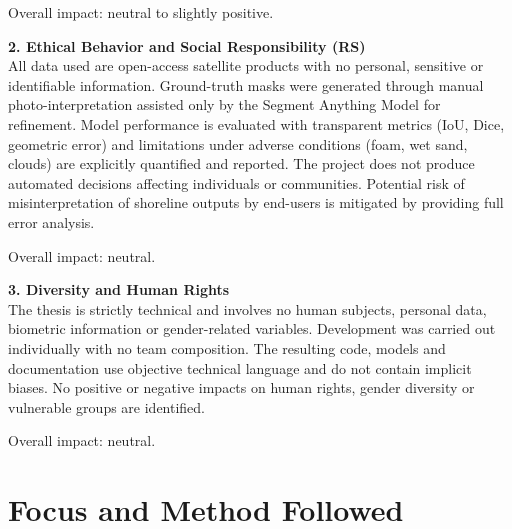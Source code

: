 ﻿\documentclass[ENG]{TFUOC}%
\begin{document}
Overall impact: neutral to slightly positive.

\textbf{2. Ethical Behavior and Social Responsibility (RS)} \\
All data used are open-access satellite products with no personal, sensitive or identifiable information. Ground-truth masks were generated through manual photo-interpretation assisted only by the Segment Anything Model for refinement. Model performance is evaluated with transparent metrics (IoU, Dice, geometric error) and limitations under adverse conditions (foam, wet sand, clouds) are explicitly quantified and reported. The project does not produce automated decisions affecting individuals or communities. Potential risk of misinterpretation of shoreline outputs by end-users is mitigated by providing full error analysis.

Overall impact: neutral.

\textbf{3. Diversity and Human Rights} \\
The thesis is strictly technical and involves no human subjects, personal data, biometric information or gender-related variables. Development was carried out individually with no team composition. The resulting code, models and documentation use objective technical language and do not contain implicit biases. No positive or negative impacts on human rights, gender diversity or vulnerable groups are identified.

Overall impact: neutral.

\section{Focus and Method Followed}
\end{document}
